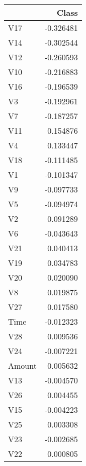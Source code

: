 \begin{tabular}{lr}
\toprule
 & Class \\
\midrule
V17 & -0.326481 \\
V14 & -0.302544 \\
V12 & -0.260593 \\
V10 & -0.216883 \\
V16 & -0.196539 \\
V3 & -0.192961 \\
V7 & -0.187257 \\
V11 & 0.154876 \\
V4 & 0.133447 \\
V18 & -0.111485 \\
V1 & -0.101347 \\
V9 & -0.097733 \\
V5 & -0.094974 \\
V2 & 0.091289 \\
V6 & -0.043643 \\
V21 & 0.040413 \\
V19 & 0.034783 \\
V20 & 0.020090 \\
V8 & 0.019875 \\
V27 & 0.017580 \\
Time & -0.012323 \\
V28 & 0.009536 \\
V24 & -0.007221 \\
Amount & 0.005632 \\
V13 & -0.004570 \\
V26 & 0.004455 \\
V15 & -0.004223 \\
V25 & 0.003308 \\
V23 & -0.002685 \\
V22 & 0.000805 \\
\bottomrule
\end{tabular}
